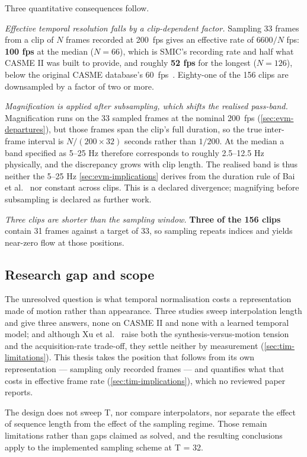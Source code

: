 Three quantitative consequences follow.

\textit{Effective temporal resolution falls by a clip-dependent factor.} Sampling 33 frames from a clip of $N$ frames recorded at 200~fps gives an effective rate of $6600/N$ fps: \textbf{100 fps} at the median ($N = 66$), which is SMIC's recording rate and half what CASME II was built to provide, and roughly \textbf{52 fps} for the longest ($N = 126$), below the original CASME database's 60~fps~\cite{yan2014}. Eighty-one of the 156 clips are downsampled by a factor of two or more.

\textit{Magnification is applied after subsampling, which shifts the realised pass-band.} Magnification runs on the 33 sampled frames at the nominal 200~fps (\autoref{sec:evm-departures}), but those frames span the clip's full duration, so the true inter-frame interval is $N/(200 \times 32)$ seconds rather than $1/200$. At the median a band specified as 5--25 Hz therefore corresponds to roughly 2.5--12.5 Hz physically, and the discrepancy grows with clip length. The realised band is thus neither the 5--25 Hz \autoref{sec:evm-implications} derives from the duration rule of Bai et al.~\cite{bai2021} nor constant across clips. This is a declared divergence; magnifying before subsampling is declared as further work.

\textit{Three clips are shorter than the sampling window.} \textbf{Three of the 156 clips} contain 31 frames against a target of 33, so sampling repeats indices and yields near-zero flow at those positions.

\subsection{Research gap and scope}
\label{sec:tim-gap}

The unresolved question is what temporal normalisation costs a representation made of motion rather than appearance. Three studies sweep interpolation length and give three answers, none on CASME II and none with a learned temporal model; and although Xu et al.~\cite{xu2017} raise both the synthesis-versus-motion tension and the acquisition-rate trade-off, they settle neither by measurement (\autoref{sec:tim-limitations}). This thesis takes the position that follows from its own representation --- sampling only recorded frames --- and quantifies what that costs in effective frame rate (\autoref{sec:tim-implications}), which no reviewed paper reports.

The design does not sweep T, nor compare interpolators, nor separate the effect of sequence length from the effect of the sampling regime. Those remain limitations rather than gaps claimed as solved, and the resulting conclusions apply to the implemented sampling scheme at T = 32.
